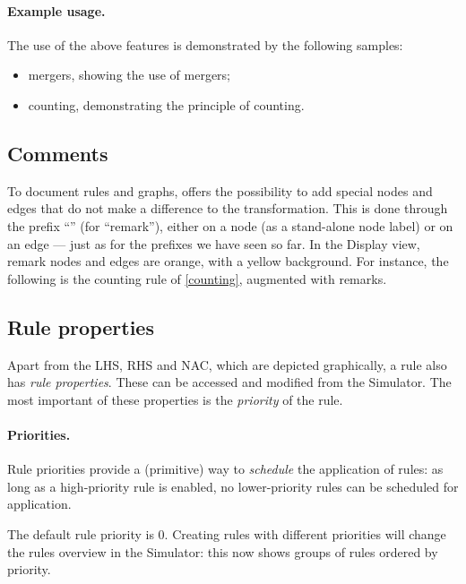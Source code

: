 \paragraph{Example usage.}

The use of the above features is demonstrated by the following \GROOVE samples:
%
\begin{itemize}[noitemsep]
\item \textsf{mergers}, showing the use of mergers;
\item \textsf{counting}, demonstrating the principle of counting.
\end{itemize}

\subsection{Comments}

To document rules and graphs, \GROOVE offers the possibility to add special
nodes and edges that do not make a difference to the transformation. This is
done through the prefix ``\remP'' (for ``remark''), either on a node (as a
stand-alone node label) or on an edge --- just as for the prefixes we have seen
so far. In the Display view, remark nodes and edges are orange, with a yellow
background. For instance, the following is the counting rule of
\eqref{counting}, augmented with remarks.


\subsection{Rule properties}

Apart from the LHS, RHS and NAC, which are depicted graphically, a rule also
has \emph{rule properties}. These can be accessed and modified from the
Simulator. The most important of these properties is the \emph{priority} of the
rule.

\paragraph{Priorities.}

Rule priorities provide a (primitive) way to
\emph{schedule} the application of rules: as long as a high-priority rule is
enabled, no lower-priority rules can be scheduled for application.

The default rule priority is 0. Creating rules with different priorities will
change the rules overview in the Simulator: this now shows groups of rules
ordered by priority.


